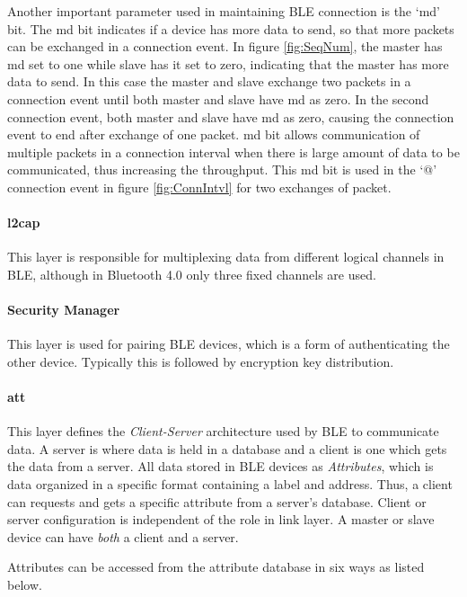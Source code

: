  
Another important parameter used in maintaining BLE connection is the `\gls{md}' bit. The \gls{md} bit indicates if a device has more data to send, so that more packets can be exchanged in a connection event. In figure \ref{fig:SeqNum}, the master has \gls{md} set to one while slave has it set to zero, indicating that the master has more data to send. In this case the master and slave exchange two packets in a connection event until both master and slave have \gls{md} as zero. In the second connection event, both master and slave have \gls{md} as zero, causing the connection event to end after exchange of one packet. \gls{md} bit allows communication of multiple packets in a connection interval when there is large amount of data to be communicated, thus increasing the throughput. This \gls{md} bit is used in the `@' connection event in figure \ref{fig:ConnIntvl} for two exchanges of packet.

\paragraph{\gls{l2cap}} This layer is responsible for multiplexing data from different logical channels in BLE, although in Bluetooth 4.0 only three fixed channels are used. 

\paragraph{Security Manager} This layer is used for pairing BLE devices, which is a form of authenticating the other device. Typically this is followed by encryption key distribution.

\paragraph{\gls{att}} This layer defines the \emph{Client-Server} architecture used by BLE to communicate data. A server is where data is held in a database and a client is one which gets the data from a server. All data stored in BLE devices as \emph{Attributes}, which is data organized in a specific format containing a label and address. Thus, a client can requests and gets a specific attribute from a server's database. Client or server configuration is independent of the role in link layer. A master or slave device can have \emph{both} a client and a server.

Attributes can be accessed from the attribute database in six ways as listed below.


